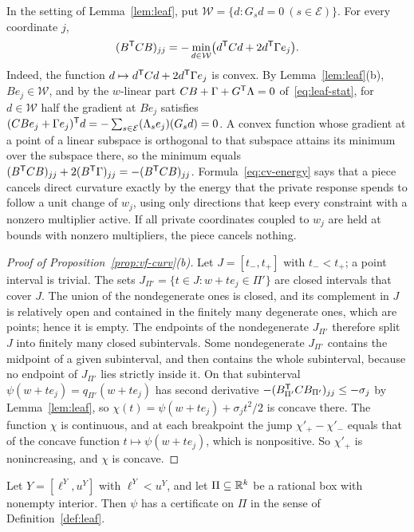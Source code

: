 In the setting of Lemma~\ref{lem:leaf}, put
$\mathcal W=\{d:G_sd=0\ (s\in\mathcal E)\}$. For every coordinate $j$,
\begin{equation}\label{eq:cv-energy}
(B^{\mathsf T}CB)_{jj}
=-\min_{d\in\mathcal W}\bigl(d^{\mathsf T}Cd+2d^{\mathsf T}\Gamma e_j\bigr).
\end{equation}
Indeed, the function $d\mapsto d^{\mathsf T}Cd+2d^{\mathsf T}\Gamma e_j$ is convex. By
Lemma~\ref{lem:leaf}(b), $Be_j\in\mathcal W$, and by the $w$-linear part
$CB+\Gamma+G^{\mathsf T}\Lambda=0$ of~\eqref{eq:leaf-stat}, for $d\in\mathcal W$
half the gradient at $Be_j$ satisfies
$(CBe_j+\Gamma e_j)^{\mathsf T}d=-\sum_{s\in\mathcal E}(\Lambda_se_j)(G_sd)=0$. A
convex function whose gradient at a point of a linear subspace is orthogonal
to that subspace attains its minimum over the subspace there, so the minimum
equals $(B^{\mathsf T}CB)_{jj}+2(B^{\mathsf T}\Gamma)_{jj}=-(B^{\mathsf T}CB)_{jj}$.
Formula~\eqref{eq:cv-energy} says that a piece cancels direct curvature
exactly by the energy that the private response spends to follow a unit
change of $w_j$, using only directions that keep every constraint with a
nonzero multiplier active. If all private coordinates coupled to $w_j$ are
held at bounds with nonzero multipliers, the piece cancels nothing.


\begin{proof}[Proof of Proposition~\ref{prop:vf-curv}(b)]
Let $J=[t_-,t_+]$ with $t_-<t_+$; a point interval is trivial. The sets
$J_{\Pi'}=\{t\in J:w+te_j\in\Pi'\}$ are closed intervals that cover $J$. The
union of the nondegenerate ones is closed, and its complement in $J$ is
relatively open and contained in the finitely many degenerate ones, which
are points; hence it is empty. The endpoints of the nondegenerate
$J_{\Pi'}$ therefore split $J$ into finitely many closed subintervals. Some
nondegenerate $J_{\Pi'}$ contains the midpoint of a given subinterval, and
then contains the whole subinterval, because no endpoint of $J_{\Pi'}$ lies
strictly inside it. On that subinterval $\psi(w+te_j)=q_{\Pi'}(w+te_j)$ has
second derivative $-(B_{\Pi'}^{\mathsf T}CB_{\Pi'})_{jj}\le-\sigma_j$ by
Lemma~\ref{lem:leaf}, so $\chi(t)=\psi(w+te_j)+\sigma_jt^2/2$ is concave
there. The function $\chi$ is continuous, and at each breakpoint the jump
$\chi'_+-\chi'_-$ equals that of the concave function $t\mapsto\psi(w+te_j)$,
which is nonpositive. So $\chi'_+$ is nonincreasing, and $\chi$ is concave.
\end{proof}

\begin{proposition}\label{prop:cert-exist}
Let $Y=[\ell^Y,u^Y]$ with $\ell^Y<u^Y$, and let $\Pi\subseteq\mathbb R^k$ be a
rational box with nonempty interior. Then $\psi$ has a certificate on $\Pi$
in the sense of Definition~\ref{def:leaf}.
\end{proposition}

